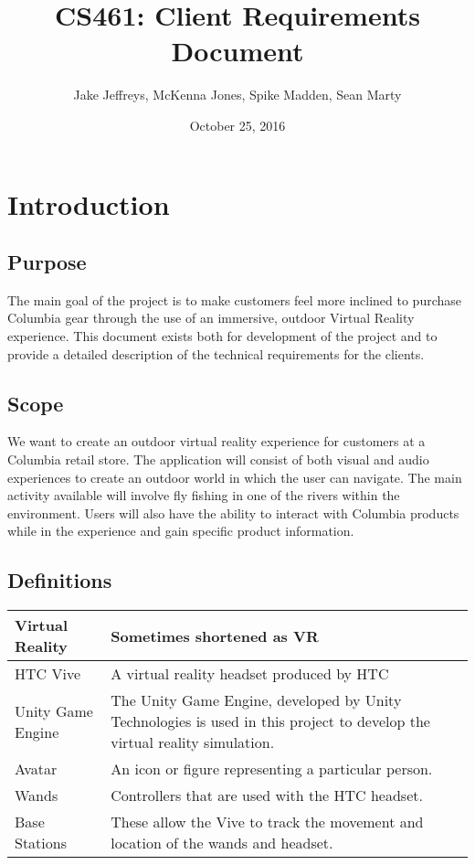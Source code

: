 \documentclass[10pt,journal,compsoc,onecolumn, draftclsnofoot]{IEEEtran}
\title{CS461: Client Requirements Document}
\author{Jake Jeffreys, McKenna Jones, Spike Madden, Sean Marty}
\date{October 25, 2016}
\begin{document}
\begin{titlepage}
\maketitle
\vspace{3cm}

\end{titlepage}

\tableofcontents
\clearpage
\section{Introduction}

\subsection{Purpose}
The main goal of the project is to make customers feel more inclined to purchase
Columbia gear through the use of an immersive, outdoor Virtual Reality
experience. This document exists both for development of the project and to provide a detailed description of the technical requirements for the clients.

\subsection{Scope}
We want to create an outdoor virtual reality experience for customers at a
Columbia retail store. The application will consist of both visual and audio
experiences to create an outdoor world in which the user can navigate. The main
activity available will involve fly fishing in one of the rivers within the
environment. Users will also have the ability to interact with Columbia products
while in the experience and gain specific product information.

\subsection{Definitions}
\begin{center}
	\begin{tabular}{| m{3cm} | m{9cm} |}
		\hline
		Virtual Reality & Sometimes shortened as VR \\
		\hline
		HTC Vive & A virtual reality headset produced by HTC \\
		\hline
		Unity Game Engine & The Unity Game Engine, developed by Unity
		Technologies is used in this project to develop the virtual reality simulation. \\
    	\hline
    	Avatar & An icon or figure representing a particular person. \\
    	\hline
    	Wands & Controllers that are used with the HTC headset. \\
    	\hline
		Base Stations & These allow the Vive to track the movement and location of the wands and headset. \\
		\hline
	\end{tabular}
\end{center}
\end{document}
